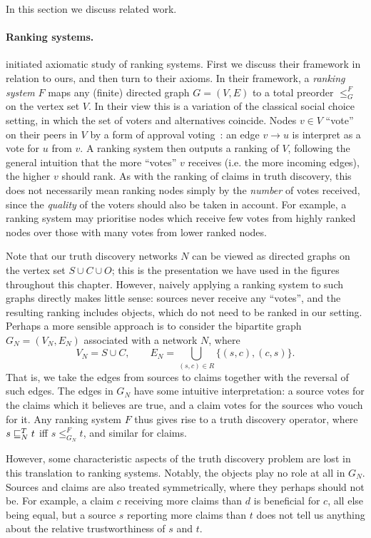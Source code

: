 In this section we discuss related work.

\paragraph{Ranking systems.} \textcite{altman2008} initiated axiomatic study of
ranking systems. First we discuss their framework in relation to ours, and then
turn to their axioms. In their framework, a \emph{ranking system} $F$ maps any
(finite) directed graph $G = (V, E)$ to a total preorder $\le_G^F$ on the
vertex set $V$. In their view this is a variation of the classical social
choice setting, in which the set of voters and alternatives coincide. Nodes $v
\in V$ ``vote'' on their peers in $V$ by a form of approval
voting~\cite{laslier2010handbook}: an edge $v \to u$ is interpret as a vote for
$u$ from $v$. A ranking system then outputs a ranking of $V$, following the
general intuition that the more ``votes'' $v$ receives (i.e. the more incoming
edges), the higher $v$ should rank. As with the ranking of claims in truth
discovery, this does not necessarily mean ranking nodes simply by the
\emph{number} of votes received, since the \emph{quality} of the voters should
also be taken in account. For example, a ranking system may prioritise nodes
which receive few votes from highly ranked nodes over those with many votes
from lower ranked nodes.

Note that our truth discovery networks $N$ can be viewed as directed graphs on
the vertex set $S \cup C \cup O$; this is the presentation we have used in the
figures throughout this chapter. However, naively applying a ranking system to
such graphs directly makes little sense: sources never receive any ``votes'',
and the resulting ranking includes objects, which do not need to be ranked in
our setting. Perhaps a more sensible approach is to consider the bipartite
graph $G_N = (V_N, E_N)$ associated with a network $N$, where
\[
    V_N = S \cup C, \qquad E_N = \bigcup_{(s, c) \in R}{ \{(s, c), (c, s)\} }.
\]
That is, we
take the edges from sources to claims together with the reversal of such edges.
The edges in $G_N$ have some intuitive interpretation: a source votes for the
claims which it believes are true, and a claim votes for the sources who vouch for
it.  Any ranking system $F$ thus gives rise to a truth discovery operator,
where $s \sqsubseteq_N^T t$ iff $s \le_{G_N}^F t$, and similar for claims.

However, some characteristic aspects of the truth discovery problem are lost in
this translation to ranking systems. Notably, the objects play no role at all
in $G_N$. Sources and claims are also treated symmetrically, where they perhaps
should not be. For example, a claim $c$ receiving more claims than $d$ is
beneficial for $c$, all else being equal, but a source $s$
reporting more claims than $t$ does not tell us anything about the relative
trustworthiness of $s$ and $t$.


